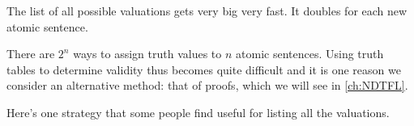 

The list of all possible valuations gets very big very fast. It doubles for each new atomic sentence. 

There are $2^n$ ways to assign truth values to $n$ atomic sentences. Using truth tables to determine validity thus becomes quite difficult and it is one reason we consider an alternative method: that of proofs, which we will see in \cref{ch:NDTFL}.


Here's one strategy that some people find useful for listing all the valuations. 

